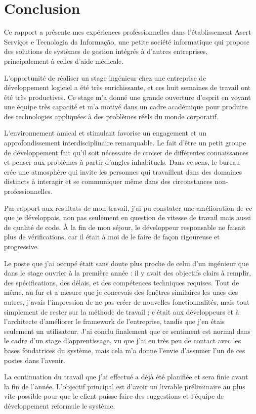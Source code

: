 \chapter{Conclusion}

Ce rapport a présente mes expériences professionnelles dans l'établissement Asert Serviços e Tecnologia da Informação, une petite société informatique qui propose des solutions de systèmes de gestion intégrés à d'autres entreprises, principalement à celles d'aide médicale. 

L'opportunité de réaliser un stage ingénieur chez une entreprise de développement logiciel a été très enrichissante, et ces huit semaines de travail ont été très productives. Ce stage m'a donné une grande ouverture d'esprit en voyant une équipe très capacité et m'a motivé dans un cadre académique pour produire des technologies appliquées à des problèmes réels du monde corporatif.

L'environnement amical et stimulant favorise un engagement et un approfondissement interdisciplinaire remarquable. Le fait d'être un petit groupe de développement fait qu'il soit nécessaire de croiser de différentes connaissances et penser aux problèmes à partir d'angles inhabituels. Dans ce sens, le bureau crée une atmosphère qui invite les personnes qui travaillent dans des domaines distincts à interagir et se communiquer même dans des circonstances non-professionnelles. 

Par rapport aux résultats de mon travail, j'ai pu constater une amélioration de ce que je développais, non pas seulement en question de vitesse de travail mais aussi de qualité de code. À la fin de mon séjour, le développeur responsable ne faisait plus de vérifications, car il était à moi de le faire de façon rigoureuse et progressive. 

Le poste que j'ai occupé était sans doute plus proche de celui d'un ingénieur que dans le stage ouvrier à la première année : il y avait des objectifs clairs à remplir, des spécifications, des délais, et des compétences techniques requises. Tout de même, au fur et a mesure que je concevais des fenêtres similaires les unes des autres, j'avais l'impression de ne pas créer de nouvelles fonctionnalités, mais tout simplement de rester sur la méthode de travail ; c'était aux développeurs et à l'architecte d'améliorer le framework de l'entreprise, tandis que j'en étais seulement un utilisateur. J'ai conclu finalement que ce sentiment est normal dans le cadre d'un stage d'apprentissage, vu que j'ai eu très peu de contact avec les bases fondatrices du système, mais cela m'a donne l'envie d'assumer l'un de ces postes dans l'avenir.

La continuation du travail que j'ai effectué a déjà été planifiée et sera finie avant la fin de l'année. L'objectif principal est d'avoir un livrable préliminaire au plus vite possible pour que le client puisse faire des suggestions et l'équipe de développement reformule le système. 
